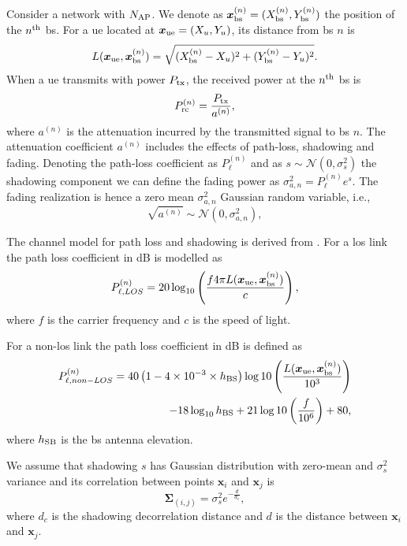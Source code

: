 \documentclass[twocolumns]{IEEEtran}
\begin{document}
Consider a network with $N_{\rm AP}$. We denote as $\bm{x}_{\rm bs}^{(n)} =(X_{\rm bs}^{(n)},Y_{\rm bs}^{(n)})$ the position of the $n^{\rm th}$ \ac{bs}. For a \ac{ue} located at $\bm{x}_{\rm ue}=(X_u,Y_u)$, its distance from \ac{bs} $n$ is
\begin{equation}
    L(\bm{x}_{\rm ue},\bm{x}_{\rm bs}^{(n)}) = \sqrt{(X_{\rm bs}^{(n)}-X_u)^2+(Y_{\rm bs}^{(n)}-Y_u)^2}.
\end{equation}
When a \ac{ue} transmits with power $P_{\rm tx}$, the received power at the $n^{\rm th}$ \ac{bs} is
\begin{equation}\label{eq: rec pow}
    P_{\rm rc}^{(n)}= \frac{P_{\rm tx}}{a^{(n)}},
\end{equation}
where $a^{(n)}$ is the attenuation incurred by the transmitted signal to \ac{bs} $n$. The attenuation coefficient $a^{(n)}$ includes the effects of path-loss, shadowing and fading. Denoting the path-loss coefficient as $P_{\ell}^{(n)}$ and as $s \sim \mathcal{N}(0,\sigma_s^2)$ the shadowing component we can define the fading power as $\sigma_{a,n}^2={P_{\ell}^{(n)}}e^{s}$. The fading realization is hence a zero mean $\sigma_{a,n}^2$ Gaussian random variable, i.e.,
\begin{equation}
    \sqrt{a^{(n)}} \sim \mathcal{N}\left(0,\sigma_{a,n}^2\right),
\end{equation}

The channel model for path loss and shadowing is derived from \cite{3gpp}. For a \ac{los} link the path loss coefficient in dB is modelled as
\begin{equation}\label{eq:los}
    P_{\ell,LOS}^{(n)} = 20\log_{10}\left(\frac{f 4\pi L(\bm{x}_{\rm ue},\bm{x}_{\rm bs}^{(n)})}{c}\right),
\end{equation}
where $f$ is the carrier frequency and $c$ is the speed of light.

For a  non-\ac{los} link the path loss coefficient in dB is defined as
\begin{equation}
\begin{split}
    P_{\ell, non-LOS}^{(n)} = 40\left(1-4\times 10^{-3}\times h_{\rm BS}\right)\log10\left (\frac{L(\bm{x}_{\rm ue},\bm{x}_{\rm bs}^{(n)})}{10^3}\right ) \\
    -18\log_{10}h_{\rm BS}
    + 21\log10\left(\frac{f}{10^6}\right) + 80,
    \end{split}
\end{equation}
where $h_{\rm SB}$ is the \ac{bs} antenna elevation.

We assume that shadowing $s$ has  Gaussian distribution with zero-mean and $\sigma_s^2$ variance and its correlation between points $\bm{x}_i$ and $\bm{x}_j$ is
\begin{equation}\label{eq: coor mat}
    \bm{\Sigma}_{(i,j)} = \sigma_s^2e^{-\frac{d}{d_c}},
\end{equation}
where $d_c$ is the shadowing decorrelation distance and $d$ is the distance between $\bm{x}_i$ and $\bm{x}_j$. 
\end{document}
